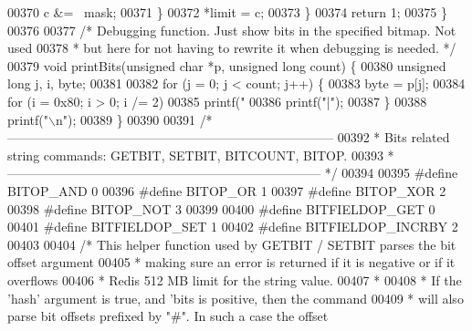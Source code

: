 \begin{DoxyCode}
00370             c &= ~mask;
00371         \}
00372         *limit = c;
00373     \}
00374     \textcolor{keywordflow}{return} 1;
00375 \}
00376 
00377 \textcolor{comment}{/* Debugging function. Just show bits in the specified bitmap. Not used}
00378 \textcolor{comment}{ * but here for not having to rewrite it when debugging is needed. */}
00379 \textcolor{keywordtype}{void} printBits(\textcolor{keywordtype}{unsigned} \textcolor{keywordtype}{char} *p, \textcolor{keywordtype}{unsigned} \textcolor{keywordtype}{long} count) \{
00380     \textcolor{keywordtype}{unsigned} \textcolor{keywordtype}{long} j, i, byte;
00381 
00382     \textcolor{keywordflow}{for} (j = 0; j < count; j++) \{
00383         byte = p[j];
00384         \textcolor{keywordflow}{for} (i = 0x80; i > 0; i /= 2)
00385             printf(\textcolor{stringliteral}{"%
00386         printf(\textcolor{stringliteral}{"|"});
00387     \}
00388     printf(\textcolor{stringliteral}{"\(\backslash\)n"});
00389 \}
00390 
00391 \textcolor{comment}{/* -----------------------------------------------------------------------------}
00392 \textcolor{comment}{ * Bits related string commands: GETBIT, SETBIT, BITCOUNT, BITOP.}
00393 \textcolor{comment}{ * -------------------------------------------------------------------------- */}
00394 
00395 \textcolor{preprocessor}{#}\textcolor{preprocessor}{define} \textcolor{preprocessor}{BITOP\_AND}   0
00396 \textcolor{preprocessor}{#}\textcolor{preprocessor}{define} \textcolor{preprocessor}{BITOP\_OR}    1
00397 \textcolor{preprocessor}{#}\textcolor{preprocessor}{define} \textcolor{preprocessor}{BITOP\_XOR}   2
00398 \textcolor{preprocessor}{#}\textcolor{preprocessor}{define} \textcolor{preprocessor}{BITOP\_NOT}   3
00399 
00400 \textcolor{preprocessor}{#}\textcolor{preprocessor}{define} \textcolor{preprocessor}{BITFIELDOP\_GET} 0
00401 \textcolor{preprocessor}{#}\textcolor{preprocessor}{define} \textcolor{preprocessor}{BITFIELDOP\_SET} 1
00402 \textcolor{preprocessor}{#}\textcolor{preprocessor}{define} \textcolor{preprocessor}{BITFIELDOP\_INCRBY} 2
00403 
00404 \textcolor{comment}{/* This helper function used by GETBIT / SETBIT parses the bit offset argument}
00405 \textcolor{comment}{ * making sure an error is returned if it is negative or if it overflows}
00406 \textcolor{comment}{ * Redis 512 MB limit for the string value.}
00407 \textcolor{comment}{ *}
00408 \textcolor{comment}{ * If the 'hash' argument is true, and 'bits is positive, then the command}
00409 \textcolor{comment}{ * will also parse bit offsets prefixed by "#". In such a case the offset}
}
\end{DoxyCode}

